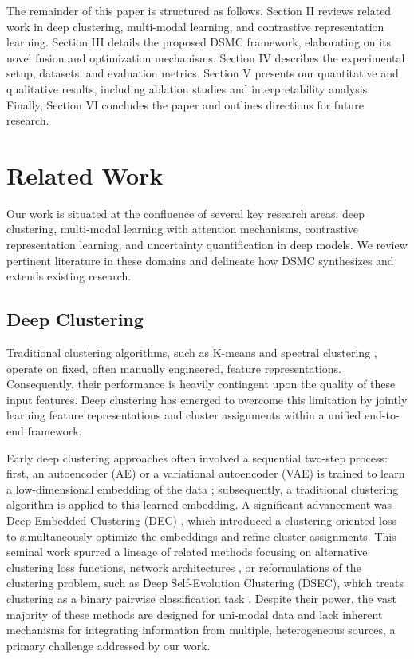 \documentclass[journal]{IEEEtran}
\begin{document}
The remainder of this paper is structured as follows. Section II reviews related work in deep clustering, multi-modal learning, and contrastive representation learning. Section III details the proposed DSMC framework, elaborating on its novel fusion and optimization mechanisms. Section IV describes the experimental setup, datasets, and evaluation metrics. Section V presents our quantitative and qualitative results, including ablation studies and interpretability analysis. Finally, Section VI concludes the paper and outlines directions for future research.

\section{Related Work}
Our work is situated at the confluence of several key research areas: deep clustering, multi-modal learning with attention mechanisms, contrastive representation learning, and uncertainty quantification in deep models. We review pertinent literature in these domains and delineate how DSMC synthesizes and extends existing research.

\subsection{Deep Clustering}
Traditional clustering algorithms, such as K-means \cite{kmeans_clustering} and spectral clustering \cite{spectral_clustering}, operate on fixed, often manually engineered, feature representations. Consequently, their performance is heavily contingent upon the quality of these input features. Deep clustering has emerged to overcome this limitation by jointly learning feature representations and cluster assignments within a unified end-to-end framework.

Early deep clustering approaches often involved a sequential two-step process: first, an autoencoder (AE) or a variational autoencoder (VAE) is trained to learn a low-dimensional embedding of the data \cite{autoencoder_representation_learning}; subsequently, a traditional clustering algorithm is applied to this learned embedding. A significant advancement was Deep Embedded Clustering (DEC) \cite{deep_embedding_clustering_xie}, which introduced a clustering-oriented loss to simultaneously optimize the embeddings and refine cluster assignments. This seminal work spurred a lineage of related methods focusing on alternative clustering loss functions, network architectures \cite{improved_dec}, or reformulations of the clustering problem, such as Deep Self-Evolution Clustering (DSEC), which treats clustering as a binary pairwise classification task \cite{dsec_chang_tpami}.
Despite their power, the vast majority of these methods are designed for uni-modal data and lack inherent mechanisms for integrating information from multiple, heterogeneous sources, a primary challenge addressed by our work.
\end{document}
